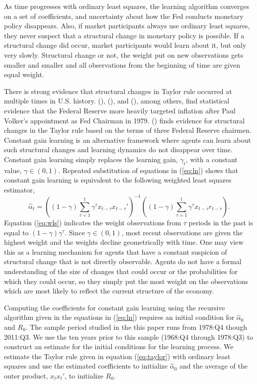 \documentclass[12pt]{article}
\newcommand{\beq}{\begin{equation}}
\newcommand{\eeq}{\end{equation}}
\newcommand{\citee}[1]{\citename{#1} (\citeyear{#1})}
\begin{document}
As time progresses with ordinary least squares, the learning algorithm converges on a set of coefficients, and uncertainty about how the Fed conducts monetary policy disappears.  Also, if market participants always use ordinary least squares, they never suspect that a structural change in monetary policy is possible.  If a structural change did occur, market participants would learn about it, but only very slowly.  Structural change or not, the weight put on new observations gets smaller and smaller and all observations from the beginning of time are given equal weight.  

There is strong evidence that structural changes in Taylor rule occurred at multiple times in U.S. history.  \citee{taylor1999}, \citee{cgg2000}, and \citee{orphanides2003}, among others, find statistical evidence that the Federal Reserve more heavily targeted inflation after Paul Volker's appointment as Fed Chairman in 1979.  \citee{juddrude} finds evidence for structural changes in the Taylor rule based on the terms of three Federal Reserve chairmen.  Constant gain learning is an alternative framework where agents can learn about such structural changes and learning dynamics do not disappear over time.  Constant gain learning simply replaces the learning gain, $\gamma_t$, with a constant value, $\gamma \in (0,1)$.  Repeated substitution of equations in (\ref{eq:ln}) shows that constant gain learning is equivalent to the following weighted least squares estimator,
\beq \label{eq:wls} \hat{\alpha}_t = \left( (1-\gamma)  \sum_{\tau=1}^{t} \gamma^{\tau} x_{t-\tau} x_{t-\tau}' \right)^{-1}  \left( (1-\gamma)  \sum_{\tau=1}^{t} \gamma^{\tau} x_{t-\tau}  r_{t-\tau} \right). \eeq
Equation (\ref{eq:wls}) indicates the weight observations from $\tau$ periods in the past is equal to $(1-\gamma)\gamma^{\tau}$.  Since $\gamma \in (0,1)$, most recent observations are given the highest weight and the weights decline geometrically with time.  One may view this as a learning mechanism for agents that have a constant suspicion of structural change that is not directly observable.  Agents do not have a formal understanding of the size of changes that could occur or the probabilities for which they could occur, so they simply put the most weight on the observations which are most likely to reflect the current structure of the economy.

Computing the coefficients for constant gain learning using the recursive algorithm given in the equations in (\ref{eq:ln}) requires an initial condition for $\hat{\alpha}_0$ and $R_0$.  The sample period studied in the this paper runs from 1978:Q4 though 2011:Q3.  We use the ten years prior to this sample (1968:Q4 through 1978:Q3) to construct an estimate for the initial conditions for the learning process.  We estimate the Taylor rule given in equation (\ref{eq:taylor}) with ordinary least squares and use the estimated coefficients to initialize $\hat{\alpha}_0$ and the average of the outer product, $x_t x_t'$, to initialize $R_0$.
\end{document}
